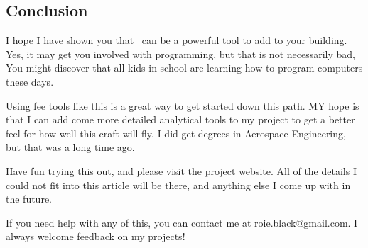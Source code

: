 \subsection{Conclusion}

I hope I have shown you that \osc\ can be a powerful tool to add to your
building. Yes, it may get you involved with programming, but that is not
necessarily bad, You might discover that all kids in school are learning how to
program computers these days.

Using fee tools like this is a great way to get started down this path. MY hope
is that I can add come more detailed analytical tools to my project to get a
better feel for how well this craft will fly. I did get degrees in Aerospace
Engineering, but that was a long time ago.

Have fun trying this out, and please visit the project website. All of the
details I could not fit into this article will be there, and anything else I
come up with in the future.

If you need help with any of this, you can contact me at roie.black@gmail.com.
I always welcome feedback on my projects!

